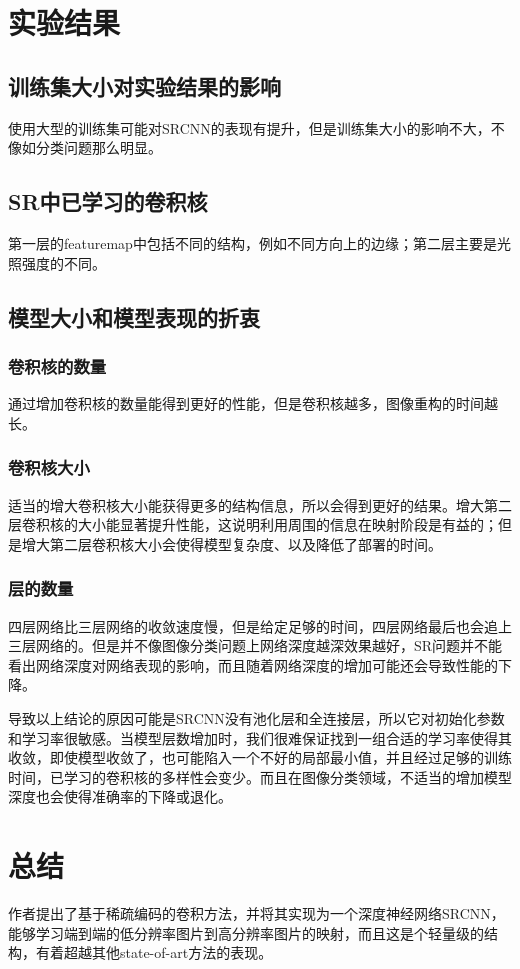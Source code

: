 \documentclass[UTF8,a4paper,10pt]{ctexrep}
\begin{document}
\section{实验结果}
\subsection{训练集大小对实验结果的影响}
使用大型的训练集可能对SRCNN的表现有提升，但是训练集大小的影响不大，不像如分类问题那么明显。
\subsection{SR中已学习的卷积核}
第一层的featuremap中包括不同的结构，例如不同方向上的边缘；第二层主要是光照强度的不同。
\subsection{模型大小和模型表现的折衷}
\subsubsection{卷积核的数量}
通过增加卷积核的数量能得到更好的性能，但是卷积核越多，图像重构的时间越长。
\subsubsection{卷积核大小}
适当的增大卷积核大小能获得更多的结构信息，所以会得到更好的结果。增大第二层卷积核的大小能显著提升性能，这说明利用周围的信息在映射阶段是有益的；但是增大第二层卷积核大小会使得模型复杂度、以及降低了部署的时间。
\subsubsection{层的数量}
四层网络比三层网络的收敛速度慢，但是给定足够的时间，四层网络最后也会追上三层网络的。但是并不像图像分类问题上网络深度越深效果越好，SR问题并不能看出网络深度对网络表现的影响，而且随着网络深度的增加可能还会导致性能的下降。

导致以上结论的原因可能是SRCNN没有池化层和全连接层，所以它对初始化参数和学习率很敏感。当模型层数增加时，我们很难保证找到一组合适的学习率使得其收敛，即使模型收敛了，也可能陷入一个不好的局部最小值，并且经过足够的训练时间，已学习的卷积核的多样性会变少。而且在图像分类领域，不适当的增加模型深度也会使得准确率的下降或退化。

\section{总结}
作者提出了基于稀疏编码的卷积方法，并将其实现为一个深度神经网络SRCNN，能够学习端到端的低分辨率图片到高分辨率图片的映射，而且这是个轻量级的结构，有着超越其他state-of-art方法的表现。
\end{document}

